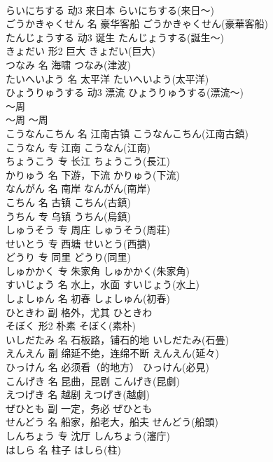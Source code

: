 \documentclass[8pt]{extreport}
\begin{document}
\begin{CJK}{UTF8}{min}
\\	らいにちする	动3	来日本	らいにちする(来日～)	
\\	ごうかきゃくせん	名	豪华客船	ごうかきゃくせん(豪華客船)	
\\	たんじょうする	动3	诞生	たんじょうする(誕生～)	
\\	きょだい	形2	巨大	きょだい(巨大)	
\\	つなみ	名	海啸	つなみ(津波)	
\\	たいへいよう	名	太平洋	たいへいよう(太平洋)	
\\	ひょうりゅうする	动3	漂流	ひょうりゅうする(漂流～)	
\\	～周	
\\	～周	～周	
\\	こうなんこちん	名	江南古镇	こうなんこちん(江南古鎮)	
\\	こうなん	专	江南	こうなん(江南)	
\\	ちょうこう	专	长江	ちょうこう(長江)	
\\	かりゅう	名	下游，下流	かりゅう(下流)	
\\	なんがん	名	南岸	なんがん(南岸)	
\\	こちん	名	古镇	こちん(古鎮)	
\\	うちん	专	乌镇	うちん(烏鎮)	
\\	しゅうそう	专	周庄	しゅうそう(周荘)	
\\	せいとう	专	西塘	せいとう(西搪)	
\\	どうり	专	同里	どうり(同里)	
\\	しゅかかく	专	朱家角	しゅかかく(朱家角)	
\\	すいじょう	名	水上，水面	すいじょう(水上)	
\\	しょしゅん	名	初春	しょしゅん(初春)	
\\	ひときわ	副	格外，尤其	ひときわ	
\\	そぼく	形2	朴素	そぼく(素朴)	
\\	いしだたみ	名	石板路，铺石的地	いしだたみ(石畳)	
\\	えんえん	副	绵延不绝，连绵不断	えんえん(延々)	
\\	ひっけん	名	必须看（的地方）	ひっけん(必見)	
\\	こんげき	名	昆曲，昆剧	こんげき(昆劇)	
\\	えつげき	名	越剧	えつげき(越劇)	
\\	ぜひとも	副	一定，务必	ぜひとも	
\\	せんどう	名	船家，船老大，船夫	せんどう(船頭)	
\\	しんちょう	专	沈厅	しんちょう(瀋庁)	
\\	はしら	名	柱子	はしら(柱)	

\end{CJK}
\end{document}
